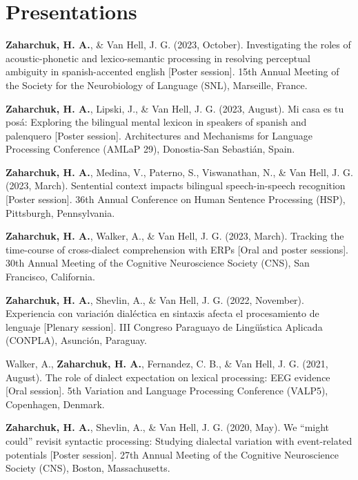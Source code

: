 \documentclass[11pt,a4paper,]{awesome-cv}
\begin{document}
\hypertarget{presentations}{%
\section{Presentations}\label{presentations}}

\hypertarget{bibliography}{}
\leavevmode{}%
\textbf{\textbf{Zaharchuk, H.} A.}, \& Van Hell, J. G. (2023, October). Investigating the
roles of acoustic-phonetic and lexico-semantic processing in resolving
perceptual ambiguity in spanish-accented english {[}Poster session{]}.
15th Annual Meeting of the Society for the Neurobiology of Language
(SNL), Marseille, France.

\leavevmode{}%
\textbf{\textbf{Zaharchuk, H.} A.}, Lipski, J., \& Van Hell, J. G. (2023, August). Mi casa
es tu posá: Exploring the bilingual mental lexicon in speakers of
spanish and palenquero {[}Poster session{]}. Architectures and
Mechanisms for Language Processing Conference (AMLaP 29), Donostia-San
Sebastián, Spain.

\leavevmode{}%
\textbf{\textbf{Zaharchuk, H.} A.}, Medina, V., Paterno, S., Viswanathan, N., \& Van Hell,
J. G. (2023, March). Sentential context impacts bilingual
speech-in-speech recognition {[}Poster session{]}. 36th Annual
Conference on Human Sentence Processing (HSP), Pittsburgh, Pennsylvania.

\leavevmode{}%
\textbf{\textbf{Zaharchuk, H.} A.}, Walker, A., \& Van Hell, J. G. (2023, March). Tracking
the time-course of cross-dialect comprehension with ERPs {[}Oral and
poster sessions{]}. 30th Annual Meeting of the Cognitive Neuroscience
Society (CNS), San Francisco, California.

\leavevmode{}%
\textbf{\textbf{Zaharchuk, H.} A.}, Shevlin, A., \& Van Hell, J. G. (2022, November).
Experiencia con variación dialéctica en sintaxis afecta el procesamiento
de lenguaje {[}Plenary session{]}. III Congreso Paraguayo de Lingüı́stica
Aplicada (CONPLA), Asunción, Paraguay.

\leavevmode{}%
Walker, A., \textbf{\textbf{Zaharchuk, H.} A.}, Fernandez, C. B., \& Van Hell, J. G.
(2021, August). The role of dialect expectation on lexical processing:
EEG evidence {[}Oral session{]}. 5th Variation and Language Processing
Conference (VALP5), Copenhagen, Denmark.

\leavevmode{}%
\textbf{\textbf{Zaharchuk, H.} A.}, Shevlin, A., \& Van Hell, J. G. (2020, May). We
{``might could''} revisit syntactic processing: Studying dialectal
variation with event-related potentials {[}Poster session{]}. 27th
Annual Meeting of the Cognitive Neuroscience Society (CNS), Boston,
Massachusetts.
\end{document}
